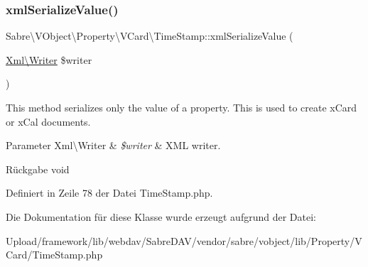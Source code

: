 \mbox{\label{class_sabre_1_1_v_object_1_1_property_1_1_v_card_1_1_time_stamp_a6bd779f7b61846ec13916096d6a76c6c}} 
\subsubsection{\texorpdfstring{xml\+Serialize\+Value()}{xmlSerializeValue()}}
{\footnotesize\ttfamily Sabre\textbackslash{}\+V\+Object\textbackslash{}\+Property\textbackslash{}\+V\+Card\textbackslash{}\+Time\+Stamp\+::xml\+Serialize\+Value (\begin{DoxyParamCaption}\item[{\mbox{\hyperlink{class_sabre_1_1_xml_1_1_writer}{Xml\textbackslash{}\+Writer}}}]{\$writer }\end{DoxyParamCaption})\hspace{0.3cm}{\ttfamily [protected]}}

This method serializes only the value of a property. This is used to create x\+Card or x\+Cal documents.


\begin{DoxyParams}[1]{Parameter}
Xml\textbackslash{}\+Writer & {\em \$writer} & X\+ML writer.\\
\hline
\end{DoxyParams}
\begin{DoxyReturn}{Rückgabe}
void 
\end{DoxyReturn}


Definiert in Zeile 78 der Datei Time\+Stamp.\+php.



Die Dokumentation für diese Klasse wurde erzeugt aufgrund der Datei\+:\begin{DoxyCompactItemize}
\item 
Upload/framework/lib/webdav/\+Sabre\+D\+A\+V/vendor/sabre/vobject/lib/\+Property/\+V\+Card/Time\+Stamp.\+php\end{DoxyCompactItemize}
